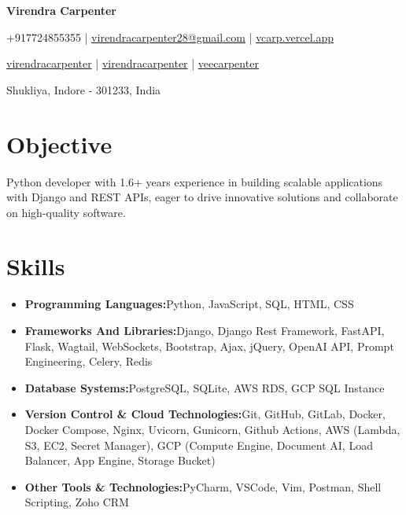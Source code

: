 \documentclass[a4paper,11pt]{article}
\newcommand{\resumeItem}[2]{
  \item{
    \textbf{#1}{\hspace{0.5mm}#2 \vspace{-0.5mm}}
  }
}
\newcommand{\resumeSubItem}[2]{\resumeItem{#1}{#2}\vspace{-4pt}}
\newcommand{\resumeHeadingSkillStart}{\begin{itemize}[leftmargin=*,itemsep=1.7mm, rightmargin=2ex]}
\newcommand{\resumeHeadingSkillEnd}{\end{itemize}\vspace{-2mm}}
\newcommand{\socialicon}[1]{\raisebox{-0.05em}{\resizebox{!}{1em}{#1}}}
\newcommand{\headerfontiii}{\fontfamily{ppl}\selectfont} %
\begin{document}
\headerfontiii

\begin{center}
    {\Huge\textbf{Virendra Carpenter}}
\end{center}
\vspace{-6mm}

\begin{center}
    \small{
    +917724855355 | \href{mailto:virendracarpenter28@gmail.com}{virendracarpenter28@gmail.com} | 
    \href{https://vcarp.vercel.app/}{vcarp.vercel.app}
    }
\end{center}
\vspace{-6mm}

\begin{center}
    \small{
    \socialicon{\faLinkedin} \href{https://www.linkedin.com/in/virendracarpenter/}{virendracarpenter} | 
    \socialicon{\faGithub} \href{https://github.com/virendracarpenter}{virendracarpenter} | 
    \socialicon{\faTwitter} \href{https://twitter.com/veecarpenter}{veecarpenter}
    }
\end{center}
\vspace{-6mm}
\begin{center}
    \small{Shukliya, Indore - 301233, India}
\end{center}

\vspace{-4mm}

\section{\textbf{Objective}}
\vspace{1mm}
\small{
  Python developer with 1.6+ years experience in building scalable applications with Django and REST APIs, eager to drive innovative solutions and collaborate on high-quality software.
}
\vspace{-2mm}


\section{\textbf{Skills}}
\vspace{-0.2mm}
  \resumeHeadingSkillStart
    \resumeSubItem{Programming Languages:}
      {Python, JavaScript, SQL, HTML, CSS}
    \resumeSubItem{Frameworks And Libraries:}
      {Django, Django Rest Framework, FastAPI, Flask, Wagtail, WebSockets, Bootstrap, Ajax,  jQuery, OpenAI API, Prompt Engineering, Celery, Redis}
    \resumeSubItem{Database Systems:}
      {PostgreSQL, SQLite, AWS RDS, GCP SQL Instance}
    \resumeSubItem{Version Control \& Cloud Technologies:}
      {Git, GitHub, GitLab, Docker, Docker Compose, Nginx, Uvicorn, Gunicorn, Github Actions, AWS (Lambda, S3, EC2, Secret Manager), GCP (Compute Engine, Document AI, Load Balancer, App Engine, Storage Bucket)}
    \resumeSubItem{Other Tools \& Technologies:}
      {PyCharm, VSCode, Vim, Postman, Shell Scripting,  Zoho CRM}
  \resumeHeadingSkillEnd
\end{document}
